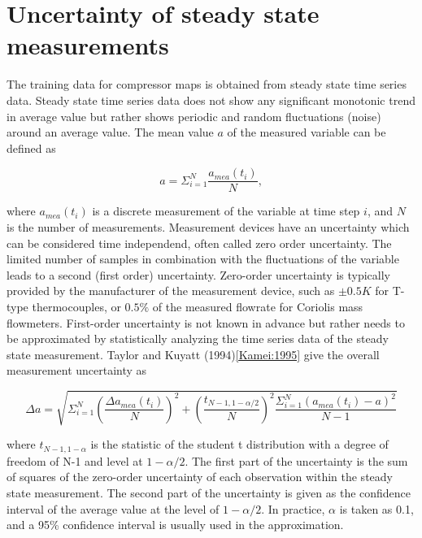 \section{Uncertainty of steady state measurements}
\label{sec:unc_steady}
The training data for compressor maps is obtained from steady state time series data. Steady state time series data does not show any significant monotonic trend in average value but rather shows periodic and random fluctuations (noise) around an average value. The mean value $a$ of the measured variable can be defined as

\begin{equation}
a = \Sigma _{i = 1}^N{\frac{{{a_{mea}}({t_i})}}{N}},
\label{eq:avg_mea}
\end{equation}

where $a_{mea}(t_i)$ is a discrete measurement of the variable at time step $i$, and $N$ is the number of measurements. Measurement devices have an uncertainty which can be considered time independend, often called zero order uncertainty. The limited number of samples in combination with the fluctuations of the variable leads to a second (first order) uncertainty.  Zero-order uncertainty is typically provided by the manufacturer of the measurement device, such as $\pm0.5K$ for T-type thermocouples, or $0.5\%$ of the measured flowrate for Coriolis mass flowmeters. First-order uncertainty is not known in advance but rather needs to be approximated by statistically analyzing the time series data of the steady state measurement. Taylor and Kuyatt (1994)\ref{Kamei:1995} give the overall measurement uncertainty as

\begin{equation}
\Delta a = \sqrt {\Sigma _{i = 1}^N{{\left(\frac{{\Delta {a_{mea}}({t_i})}}{N}\right)}^2} + {{\left(\frac{{{t_{N - 1,1 - \alpha /2}}}}{N}\right)}^2}\frac{{\Sigma _{i = 1}^N{{\left({a_{mea}}({t_i}) - a\right)}^2}}}{{N - 1}}} 
\label{eq:mea_unc_TK}
\end{equation}

where $t_{N-1,1-\alpha}$ is the statistic of the student t distribution with a degree of freedom of N-1 and level at $1-\alpha/2$. The first part of the uncertainty is the sum of squares of the zero-order uncertainty of each observation within the steady state measurement. The second part of the uncertainty is given as the confidence interval of the average value at the level of $1-\alpha/2$. In practice, $\alpha$ is taken as 0.1, and a 95\% confidence interval is usually used in the approximation.